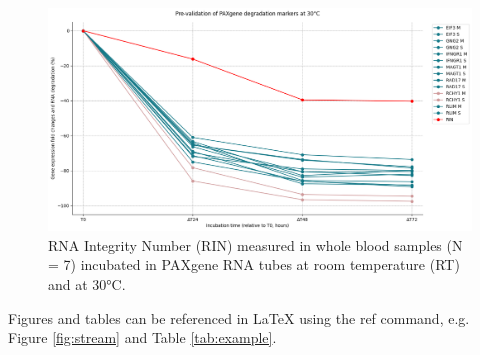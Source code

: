 \documentclass[fleqn,10pt]{wlscirep}
\begin{document}
\begin{figure}[ht]
    \centering
    \includegraphics[width=\linewidth]{figure7}
    \caption{RNA Integrity Number (RIN) measured in whole blood samples (N = 7) incubated in PAXgene RNA tubes at room temperature (RT) and at 30°C.}
    \label{fig:figure7}
    \end{figure}

Figures and tables can be referenced in LaTeX using the ref command, e.g. Figure \ref{fig:stream} and Table \ref{tab:example}.
\end{document}
